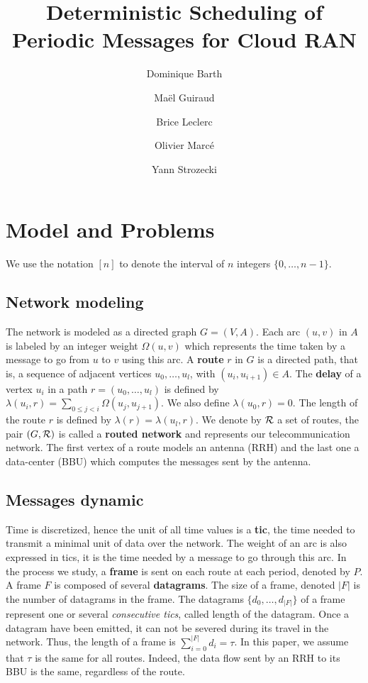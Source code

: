 \documentclass[10pt]{article}
\title{Deterministic Scheduling of Periodic Messages for Cloud RAN}
\author[1]{Dominique Barth}
\author[1,2]{Ma\"el Guiraud}
\author[2]{Brice Leclerc}
\author[2]{Olivier Marc\'e}
\author[1]{Yann Strozecki}
\affil[1]{David Laboratory, UVSQ}
\affil[2]{Nokia Bell Labs France}
\begin{document}
\maketitle\section{Model and Problems}\label{sec:def}

We use the notation $[n]$ to denote the interval of $n$ integers $\{0,\dots,n-1\}$.


  \subsection{Network modeling}
  
The network is modeled as a directed graph $G=(V,A)$. Each arc  $(u,v)$ in $A$ is labeled by an integer weight $\Omega(u,v)$ which represents the time taken by a message to go from $u$ to $v$ using this arc. A {\bf route} $r$ in $G$ is a directed path, that is, a sequence of adjacent vertices $u_0, \ldots , u_{l}$, with $(u_i,u_{i+1}) \in A$.  The {\bf delay} of a vertex $u_i$ in a path $r=(u_0,\dots,u_l)$ is defined by $\lambda(u_i,r)= \sum\limits_{0 \leq j <i} \Omega(u_j, u_{j+1})$. We also define $\lambda(u_0,r)=0$. The length of the route $r$ is defined by $\lambda (r)= \lambda (u_l,r)$.
We denote by $\cal R$ a set of routes, the pair $(G,\cal R)$ is called a {\bf routed network} and represents our telecommunication network.
The first vertex of a route models an antenna (RRH) and the last one a data-center (BBU) which computes the messages sent by the antenna.

   \subsection{Messages dynamic}
	 
    Time is discretized, hence the unit of all time values is a {\bf tic}, the time needed to transmit a minimal unit of data over the network. The weight of an arc is also expressed in tics, it is the time needed by a message to go through this arc.
        In the process we study, a {\bf frame} is sent on each route at each period, denoted by $P$.
        A frame $F$ is composed of several {\bf datagrams}. The size of a frame, denoted $|F|$ is the number of datagrams in the frame. The datagrams $\{d_0,\ldots,d_{|F|}\}$ of a frame represent one or several \emph{consecutive tics}, called length of the datagram. Once a datagram have been emitted, it can not be severed during its travel in the network. Thus, the length of a frame is $\sum_{i=0}^{{|F|}} d_i = \tau$. In this paper, we assume that $\tau$ is the same for all routes. Indeed, the data flow sent by an RRH to its BBU is the same, regardless of the route.
        
\end{document}
